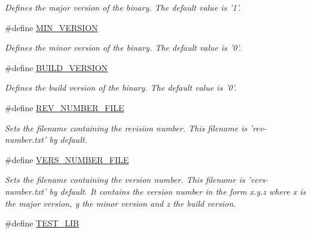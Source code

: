 \begin{DoxyCompactItemize}
\begin{DoxyCompactList}\small\item\em Defines the major version of the binary. The default value is '1'. \end{DoxyCompactList}\item 
\hypertarget{group___build___variables_gabcd45341369f87e7ad5dfefee97c6811}{\#define \hyperlink{group___build___variables_gabcd45341369f87e7ad5dfefee97c6811}{M\+I\+N\+\_\+\+V\+E\+R\+S\+I\+O\+N}}\label{group___build___variables_gabcd45341369f87e7ad5dfefee97c6811}

\begin{DoxyCompactList}\small\item\em Defines the minor version of the binary. The default value is '0'. \end{DoxyCompactList}\item 
\hypertarget{group___build___variables_gad7a967dd260384e94010b31b1412a0b4}{\#define \hyperlink{group___build___variables_gad7a967dd260384e94010b31b1412a0b4}{B\+U\+I\+L\+D\+\_\+\+V\+E\+R\+S\+I\+O\+N}}\label{group___build___variables_gad7a967dd260384e94010b31b1412a0b4}

\begin{DoxyCompactList}\small\item\em Defines the build version of the binary. The default value is '0'. \end{DoxyCompactList}\item 
\hypertarget{group___private___variables_ga0a5bb7014615bdedc7fba9605063f8b6}{\#define \hyperlink{group___private___variables_ga0a5bb7014615bdedc7fba9605063f8b6}{R\+E\+V\+\_\+\+N\+U\+M\+B\+E\+R\+\_\+\+F\+I\+L\+E}}\label{group___private___variables_ga0a5bb7014615bdedc7fba9605063f8b6}

\begin{DoxyCompactList}\small\item\em Sets the filename containing the revision number. This filename is 'rev-\/number.\+txt' by default. \end{DoxyCompactList}\item 
\hypertarget{group___private___variables_ga1508c10238d0ce8ebee8aa038ee2869c}{\#define \hyperlink{group___private___variables_ga1508c10238d0ce8ebee8aa038ee2869c}{V\+E\+R\+S\+\_\+\+N\+U\+M\+B\+E\+R\+\_\+\+F\+I\+L\+E}}\label{group___private___variables_ga1508c10238d0ce8ebee8aa038ee2869c}

\begin{DoxyCompactList}\small\item\em Sets the filename containing the version number. This filename is 'vers-\/number.\+txt' by default. It contains the version number in the form x.\+y.\+z where x is the major version, y the minor version and z the build version. \end{DoxyCompactList}\item 
\hypertarget{group___private___variables_gae7e1dc72ef29963f4486a6efe6ad8e04}{\#define \hyperlink{group___private___variables_gae7e1dc72ef29963f4486a6efe6ad8e04}{T\+E\+S\+T\+\_\+\+L\+I\+B}}\label{group___private___variables_gae7e1dc72ef29963f4486a6efe6ad8e04}


\end{DoxyCompactItemize}
